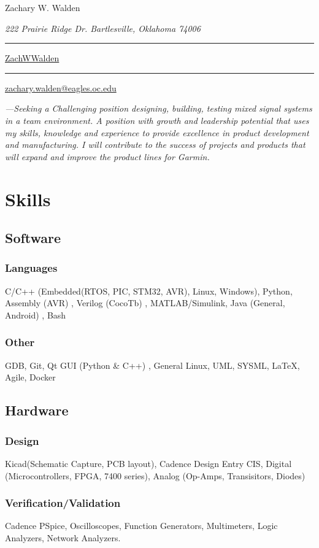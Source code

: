 \documentclass{article}
\newcommand\mybar{\kern1pt\rule[-\dp\strutbox]{.8pt}{\baselineskip}\kern1pt}
\begin{document}
\begin{center}
	\begin{Huge}
		Zachary W. Walden\\
	\end{Huge}
	\begin{large}
		\textsl{222 Prairie Ridge Dr. Bartlesville, Oklahoma 74006}\\
	\end{large}
	\begin{normalsize}
		 \mybar { } \faGithub \href{https://github.com/ZachWWalden}{ ZachWWalden}
		\mybar { }\faEnvelope\href{mailto::zachary.walden@eagles.oc.edu}{ zachary.walden@eagles.oc.edu}
	\end{normalsize}
\end{center}
\begin{spacing}{.5}


	\textit{\large{---Seeking a Challenging position designing, building, testing mixed signal systems in a team environment.  A position with growth and leadership potential that uses my skills, knowledge and experience to provide excellence in product development and manufacturing.
	I will contribute to the success of projects and products that will expand and improve the product lines for Garmin.}}

\section{Skills}
	\subsection{Software}
		\subsubsection{Languages} \large{C/C++} \small{(Embedded(RTOS, PIC, STM32, AVR), Linux, Windows)}\large{, Python, Assembly} \small{(AVR)} \large{, Verilog} \small{(CocoTb)} \large{, MATLAB/Simulink, Java} \small{(General, Android)} \large{, Bash}
		\subsubsection{Other} \large{GDB, Git, Qt GUI} \small{(Python \& C++)} \large{, General Linux, UML, SYSML, \LaTeX, Agile, Docker}
	\subsection{Hardware}
		\subsubsection{Design} \large{Kicad(Schematic Capture, PCB layout), Cadence Design Entry CIS, Digital} \small{(Microcontrollers, FPGA, 7400 series)}\large{, Analog} \small{(Op-Amps, Transisitors, Diodes)}
		\large{\subsubsection{Verification/Validation} Cadence PSpice, Oscilloscopes, Function Generators, Multimeters, Logic Analyzers, Network Analyzers.}

\end{spacing}
\end{document}
